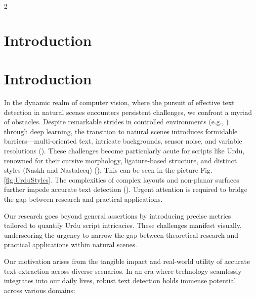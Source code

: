 \documentclass[sn-mathphys,Numbered]{sn-jnl}%
\begin{document}
\begin{multicols}{2}
\section{Introduction}

\section{Introduction}
In the dynamic realm of computer vision, where the pursuit of effective text detection in natural scenes encounters persistent challenges, we confront a myriad of obstacles. Despite remarkable strides in controlled environments (e.g., \cite{Jaderberg2014, Gupta2023}) through deep learning, the transition to natural scenes introduces formidable barriers—multi-oriented text, intricate backgrounds, sensor noise, and variable resolutions (\cite{Gomez2009, Sun2018, Khan2022}). These challenges become particularly acute for scripts like Urdu, renowned for their cursive morphology, ligature-based structure, and distinct styles (Naskh and Nastaleeq) (\cite{Khan2019}). This can be seen in the picture Fig.\ref{fig:UrduStyles}. The complexities of complex layouts and non-planar surfaces further impede accurate text detection (\cite{Shi2016}). Urgent attention is required to bridge the gap between research and practical applications.

Our research goes beyond general assertions by introducing precise metrics tailored to quantify Urdu script intricacies. These challenges manifest visually, underscoring the urgency to narrow the gap between theoretical research and practical applications within natural scenes.

Our motivation arises from the tangible impact and real-world utility of accurate text extraction across diverse scenarios. In an era where technology seamlessly integrates into our daily lives, robust text detection holds immense potential across various domains:


\end{multicols}
\end{document}
